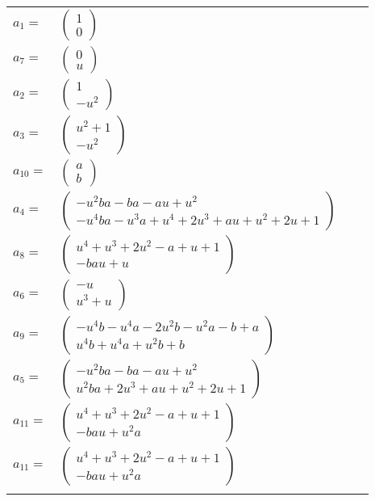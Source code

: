 \documentclass[1p]{elsarticle_modified}
\theoremstyle{definition}
\begin{document}
\begin{tabular}{m{7pt} m{180pt} m{7pt} m{180pt} }
\flushright $a_{1}=$&$\begin{pmatrix}1\\0\end{pmatrix}$ \\
\flushright $a_{7}=$&$\begin{pmatrix}0\\u\end{pmatrix}$ \\
\flushright $a_{2}=$&$\begin{pmatrix}1\\- u^2\end{pmatrix}$ \\
\flushright $a_{3}=$&$\begin{pmatrix}u^2+1\\- u^2\end{pmatrix}$ \\
\flushright $a_{10}=$&$\begin{pmatrix}a\\b\end{pmatrix}$ \\
\flushright $a_{4}=$&$\begin{pmatrix}- u^2 b a- b a- a u+u^2\\- u^4 b a- u^3 a+u^4+2 u^3+a u+u^2+2 u+1\end{pmatrix}$ \\
\flushright $a_{8}=$&$\begin{pmatrix}u^4+u^3+2 u^2- a+u+1\\- b a u+u\end{pmatrix}$ \\
\flushright $a_{6}=$&$\begin{pmatrix}- u\\u^3+u\end{pmatrix}$ \\
\flushright $a_{9}=$&$\begin{pmatrix}- u^4 b- u^4 a-2 u^2 b- u^2 a- b+a\\u^4 b+u^4 a+u^2 b+b\end{pmatrix}$ \\
\flushright $a_{5}=$&$\begin{pmatrix}- u^2 b a- b a- a u+u^2\\u^2 b a+2 u^3+a u+u^2+2 u+1\end{pmatrix}$ \\
\flushright $a_{11}=$&$\begin{pmatrix}u^4+u^3+2 u^2- a+u+1\\- b a u+u^2 a\end{pmatrix}$\\ \flushright $a_{11}=$&$\begin{pmatrix}u^4+u^3+2 u^2- a+u+1\\- b a u+u^2 a\end{pmatrix}$\\&\end{tabular}
\end{document}
